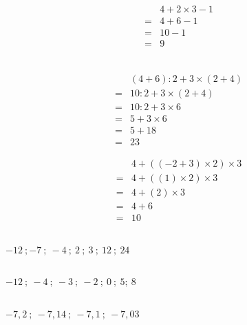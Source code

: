 
\begin{multicols}{3}
    \cnt
    \begin{align*}
      &4+2\times3-1\\
      =&4+6-1\\
      =&10-1\\
      =&9
    \end{align*}
    \\ %
    \vfill
    \columnbreak

    \cnt
    \begin{align*}
      &(4+6):2+3\times (2+4)\\
      =&10:2+3\times (2+4)\\
      =&10:2+3\times 6\\
      =&5+3\times 6\\
      =&5+18\\
      =&23
    \end{align*}
    \columnbreak

    \cnt
    \begin{align*}
    &4+((-2+3)\times 2)\times 3\\
    =&4+((1)\times 2)\times 3\\
    =&4+(2)\times 3\\
    =&4+6\\
    =&10
    \end{align*}
    \vfill
\end{multicols}



\begin{multicols}{3}
    \cnt\\ 
    $-12~;-7~;~-4~;~2~;~3~;~12~;~24$

    \cnt\\
    $-12~;~-4~;~-3~;~-2~;~0~;~5;~8$

    \cnt\\
    $-7,2~;~-7,14~;~-7,1~;~-7,03$
\end{multicols}



\begin{figure}[H]
    \centering
\end{figure}

